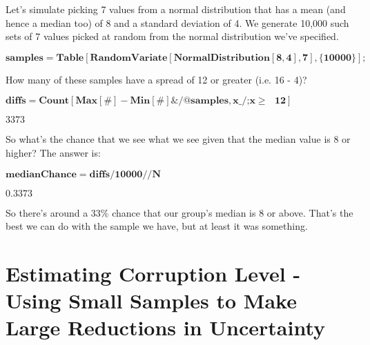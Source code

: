\documentclass{article}
\begin{document}
Let{'}s simulate picking 7 values from a normal distribution that has a mean (and hence a median too) of 8 and a standard deviation of 4. We generate
10,000 such sets of 7 values picked at random from the normal distribution we{'}ve specified.

\begin{doublespace}
\noindent\(\pmb{\text{samples} = \text{Table}[\text{RandomVariate}[\text{NormalDistribution}[8,4],7], \{10000\}];}\)
\end{doublespace}

How many of these samples have a spread of 12 or greater (i.e. 16 - 4)?

\begin{doublespace}
\noindent\(\pmb{\text{diffs} = \text{Count}[\text{Max}[\#] - \text{Min}[\#] \& \text{/@} \text{samples}, \text{x$\_$}\text{/;} x \geq \text{  }12]}\)
\end{doublespace}

\begin{doublespace}
\noindent\(3373\)
\end{doublespace}

So what{'}s the chance that we see what we see given that the median value is 8 or higher? The answer is: 

\begin{doublespace}
\noindent\(\pmb{\text{medianChance} = \text{diffs}/10000 \text{//}N}\)
\end{doublespace}

\begin{doublespace}
\noindent\(0.3373\)
\end{doublespace}

So there{'}s around a 33$\%$ chance that our group{'}s median is 8 or above. That{'}s the best we can do with the sample we have, but at least it
was something.

\section*{Estimating Corruption Level - Using Small Samples to Make Large Reductions in Uncertainty}
\end{document}
